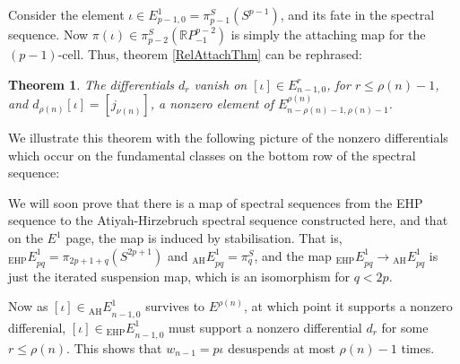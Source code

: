 \documentclass{article}
\newcommand{\R}{\mathbb{R}}
\newcommand{\RP}{\R P}
\renewcommand{\to}{\longrightarrow}
\newtheorem{thm}{Theorem}[section]
\theoremstyle{definition}
\begin{document}
Consider the element $\iota\in E^1_{p-1,0}=\pi^S_{p-1}(S^{p-1})$, and its fate in the spectral sequence. Now $\pi(\iota)\in \pi^S_{p-2}(\RP^{p-2}_{-1})$ is simply the attaching map for the $(p-1)$-cell. Thus, theorem \ref{RelAttachThm} can be rephrased:
\begin{thm}
The differentials $d_r$ vanish on $[\iota]\in E_{n-1,0}^r$, for $r\leq\rho(n)-1$, and $d_{\rho(n)}[\iota]=[j_{\nu(n)}]$, a nonzero element of $E^{\rho(n)}_{n-\rho(n)-1,\rho(n)-1}$.
\end{thm}
We illustrate this theorem with the following picture of the nonzero differentials which occur on the fundamental classes on the bottom row of the spectral sequence:
\begin{center}
\end{center}

We will soon prove that there is a map of spectral sequences from the EHP sequence to the Atiyah-Hirzebruch spectral sequence constructed here, and that on the $E^1$ page, the map is induced by stabilisation. That is, ${_\text{EHP}E}^1_{pq}=\pi_{2p+1+q}(S^{2p+1})$ and ${_\text{AH}E}^1_{pq}=\pi^S_q$, and the map ${_\text{EHP}E}^1_{pq}\to{_\text{AH}E}^1_{pq}$ is just the iterated suspension map, which is an isomorphism for $q<2p$.

Now as $[\iota]\in {_\text{AH}E}^1_{n-1,0}$ survives to $E^{\rho(n)}$, at which point it supports a nonzero differenial, $[\iota]\in {_\text{EHP}E}^1_{n-1,0}$ must support a nonzero differential $d_r$ for some $r\leq\rho(n)$. This shows that $w_{n-1}=p\iota$ desuspends at most $\rho(n)-1$ times.
\end{document}
